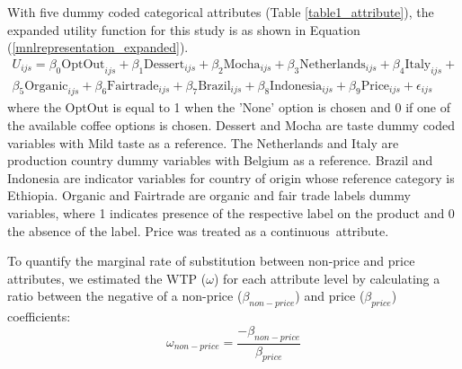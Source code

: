 \documentclass[sustainability,article,accept,moreauthors,pdftex,10pt,a4paper]{Definitions/mdpi}
\theoremstyle{mdpi}
\newcounter{ex}
\newcounter{re}
\theoremstyle{mdpidefinition}
\begin{document}
{{With five dummy coded categorical attributes (Table \ref{table1_attribute}), the expanded utility function for this study is as shown in Equation (\ref{mnlrepresentation_expanded}).
\begin{multline}\label{mnlrepresentation_expanded}
U_{ijs}  = \beta_0\mbox{OptOut}_{ijs}+\beta_1\mbox{Dessert}_{ijs}+\beta_2\mbox{Mocha}_{ijs}+\beta_3\mbox{Netherlands}_{ijs}+\beta_4\mbox{Italy}_{ijs}+ \\
\beta_5\mbox{Organic}_{ijs}+ \beta_6\mbox{Fairtrade}_{ijs}+\beta_7\mbox{Brazil}_{ijs}+\beta_8\mbox{Indonesia}_{ijs}+ \beta_9\mbox{Price}_{ijs} + \epsilon_{ijs}
\end{multline}
where the OptOut is equal to 1 when the 'None' option is chosen and 0 if one of the available coffee options is chosen. Dessert and Mocha are taste dummy coded variables with Mild taste as a reference. The Netherlands and Italy are production country dummy variables with Belgium as a reference. Brazil and Indonesia are indicator variables for country of origin whose reference category is Ethiopia. Organic and Fairtrade are organic and fair trade labels dummy variables, where 1 indicates presence of the respective label on the product and 0 the absence of the label. Price was treated as a continuous~attribute.
}
\par{To quantify the marginal rate of substitution between non-price and price attributes, we estimated the WTP ($\omega$) for each attribute level by calculating a ratio between the negative of a non-price ($\beta_{non-price}$) and price ($\beta_{price}$) coefficients:
\begin{equation}\label{wtpequation}
\omega_{non-price}= \frac{-\beta_{non-price}}{\beta_{price}}
\end{equation}}

}
\end{document}
